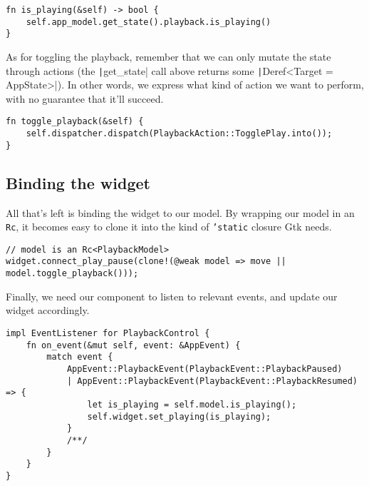 \documentclass[12pt, a4paper]{article}
\begin{document}
\begin{verbatim}
fn is_playing(&self) -> bool { 
    self.app_model.get_state().playback.is_playing()
}
\end{verbatim}

As for toggling the playback, remember that we can only mutate the state through actions (the \texttt|get_state| call above returns some \texttt|Deref<Target = AppState>|). In other words, we express what kind of action we want to perform, with no guarantee that it'll succeed.

\begin{verbatim}
fn toggle_playback(&self) {
    self.dispatcher.dispatch(PlaybackAction::TogglePlay.into());
}
\end{verbatim}

\subsection{Binding the widget}

All that's left is binding the widget to our model. By wrapping our model in an \texttt{Rc}, it becomes easy to clone it into the kind of \texttt{'static} closure Gtk needs.

\begin{verbatim}
// model is an Rc<PlaybackModel>
widget.connect_play_pause(clone!(@weak model => move || model.toggle_playback()));
\end{verbatim}

Finally, we need our component to listen to relevant events, and update our widget accordingly.

\begin{verbatim}
impl EventListener for PlaybackControl {
    fn on_event(&mut self, event: &AppEvent) {
        match event {
            AppEvent::PlaybackEvent(PlaybackEvent::PlaybackPaused)
            | AppEvent::PlaybackEvent(PlaybackEvent::PlaybackResumed) => {
                let is_playing = self.model.is_playing();
                self.widget.set_playing(is_playing);
            }
            /**/
        }
    }
}
\end{verbatim}
\end{document}
